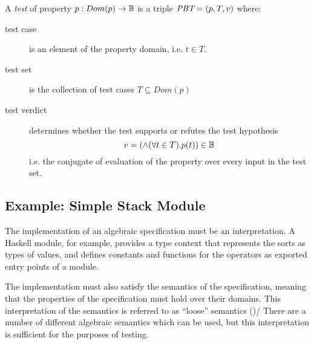 {\begin{df}
A \emph{test} of property $p:Dom(p) \rightarrow \mathbb{B}$ is a triple $\textit{PBT} = (p, T, v)$ where:

\begin{description}
\item[test case] is an element of the property domain, i.e. $t \in T$.
\item[test set] is the collection of test cases $T \subseteq Dom(p)$ 
\item[test verdict] determines whether the test supports or refutes the test hypothesis
$$ v = (\wedge (\forall t \in T) . p(t) ) \in \mathbb{B} $$
\noindent
i.e. the conjugate of evaluation of the property over every input in the test set.
\end{description}
\end{df}


\subsection{Example: Simple Stack Module}\label{sub:ListSpec}

The implementation of an algebraic specification must be an interpretation.
A Haskell module, for example,
provides a type context that represents the sorts as types of values,
and defines constants and functions for the operators as 
exported entry points of a module.

The implementation must also satisfy the semantics of the specification,
meaning that the properties of the specification must hold over their domains.
This interpretation of the semantics is referred to as 
``loose'' semantics (\cite{MeseguerGoguen1986})/
There are a number of different algebraic semantics which can be used,
but this interpretation is sufficient for the purposes of testing.

}

